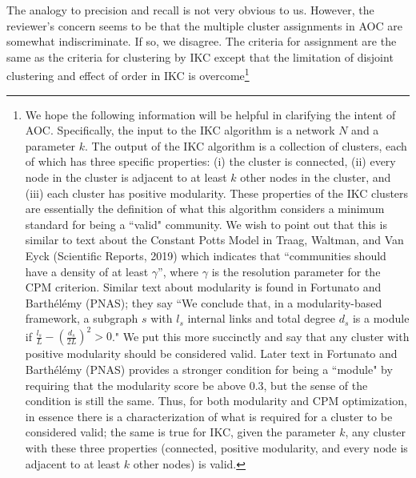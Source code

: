 \documentclass[11pt, oneside]{article}   	%
\begin{document}
\vspace{2 mm} The analogy to precision and recall is not very obvious to us. However, the reviewer's concern seems to be that the multiple cluster assignments in AOC are somewhat indiscriminate. If so, we disagree. The criteria for assignment are the same as the criteria for clustering by IKC except that the limitation of disjoint clustering and effect of order in IKC is overcome\footnote{ We hope the following information will be helpful in clarifying the intent of AOC.  Specifically, the input to the IKC algorithm is a network $N$ and a parameter $k$. The output of the IKC algorithm is a collection of clusters, each of which has three specific properties: (i) the cluster is connected, (ii) every node in the cluster is adjacent to at least $k$ other nodes in the cluster, and (iii) each cluster has positive modularity. These properties of the IKC clusters are essentially the definition of what this algorithm considers  a minimum standard for being a ``valid" community.  We wish to point out that this is similar to text about the Constant Potts Model in Traag, Waltman, and Van Eyck (Scientific Reports, 2019) which indicates that ``communities should have a density of at least $\gamma$'', where $\gamma$ is the resolution parameter for the CPM criterion.  Similar text about modularity is found in Fortunato and Barth\'el\'emy (PNAS); they  say ``We conclude that, in a modularity-based framework, a subgraph $s$ with $l_s$ internal links and total degree $d_s$ is a 
module if $\frac{l_s}{L} - \left( \frac{d_s}{2L} \right) ^2 > 0$."  We put this more succinctly and say that any cluster with positive modularity should be considered valid. 
Later text in Fortunato and Barth\'el\'emy (PNAS) provides a stronger condition for being a ``module" by requiring that the modularity score be above 0.3, but the sense of the condition is still the same. Thus, for both modularity and CPM optimization, in essence there is a characterization of what is required for a cluster to be considered valid; the same is true for IKC, given the parameter $k$, any cluster with these three properties (connected, positive modularity, and every node is adjacent to at least $k$ other nodes) is valid. 

}
\end{document}
